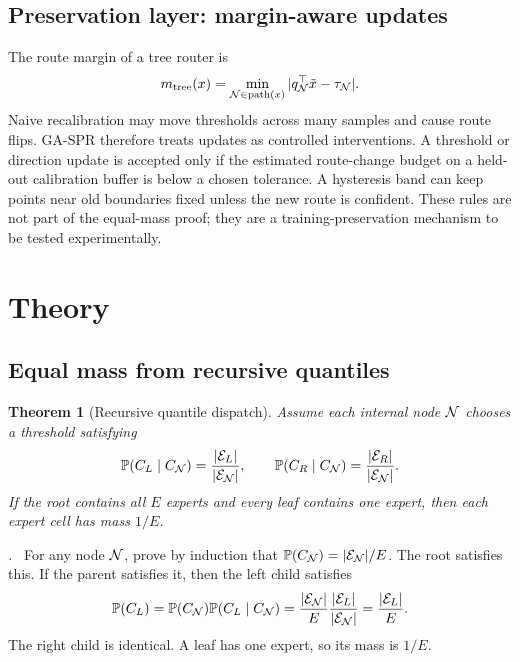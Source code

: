 \documentclass{article}
\newtheorem{theorem}{Theorem}
\renewenvironment{proof}[1][\proofname]{\par\noindent\textit{#1.}\ }{\hfill\qedsymbol\par}
\begin{document}
\subsection{Preservation layer: margin-aware updates}

The route margin of a tree router is
\begin{equation}
  m_{\mathrm{tree}}(x)=\min_{\mathcal{N}\in\mathrm{path}(x)}
  |q_{\mathcal{N}}^{\top}\tilde x-\tau_{\mathcal{N}}|.
\end{equation}
Naive recalibration may move thresholds across many samples and cause route
flips.  GA-SPR therefore treats updates as controlled interventions.  A threshold
or direction update is accepted only if the estimated route-change budget on a
held-out calibration buffer is below a chosen tolerance.  A hysteresis band can
keep points near old boundaries fixed unless the new route is confident.  These
rules are not part of the equal-mass proof; they are a training-preservation
mechanism to be tested experimentally.

\section{Theory}

\subsection{Equal mass from recursive quantiles}

\begin{theorem}[Recursive quantile dispatch]
\label{thm:recursive_quantile}
Assume each internal node $\mathcal{N}$ chooses a threshold satisfying
\begin{equation}
  \mathbb{P}(C_L\mid C_{\mathcal{N}})=\frac{|\mathcal{E}_L|}{|\mathcal{E}_{\mathcal{N}}|},\qquad
  \mathbb{P}(C_R\mid C_{\mathcal{N}})=\frac{|\mathcal{E}_R|}{|\mathcal{E}_{\mathcal{N}}|}.
\end{equation}
If the root contains all $E$ experts and every leaf contains one expert, then
each expert cell has mass $1/E$.
\end{theorem}

\begin{proof}
For any node $\mathcal{N}$, prove by induction that
$\mathbb{P}(C_{\mathcal{N}})=|\mathcal{E}_{\mathcal{N}}|/E$.  The root satisfies this.  If the parent
satisfies it, then the left child satisfies
\begin{equation}
\mathbb{P}(C_L)=\mathbb{P}(C_{\mathcal{N}})\mathbb{P}(C_L\mid C_{\mathcal{N}})
=\frac{|\mathcal{E}_{\mathcal{N}}|}{E}\frac{|\mathcal{E}_L|}{|\mathcal{E}_{\mathcal{N}}|}
=\frac{|\mathcal{E}_L|}{E}.
\end{equation}
The right child is identical.  A leaf has one expert, so its mass is $1/E$.
\end{proof}
\end{document}
